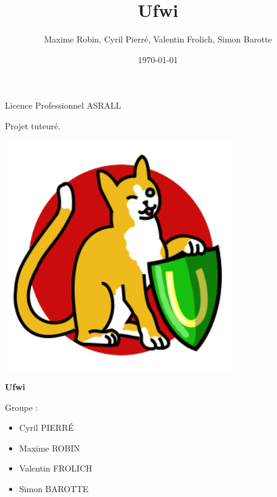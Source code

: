 \documentclass[12pt]{report}
\title{Ufwi}
\author{Maxime Robin, Cyril Pierré, Valentin Frolich, Simon Barotte}
\date{\today}
\begin{document}
\thispagestyle{empty}
\begin{center}
Licence Professionnel ASRALL


\vspace{1cm}
Projet tuteuré.

\vspace{2,5cm}

\begin{center}
  \includegraphics[width=10cm,height=10cm]{images/ufwi.png}
\end{center}

\vspace{1cm}
\textbf{\Huge Ufwi}


\end{center}

\vspace{4cm}

Groupe :
\begin{itemize}
  \item Cyril PIERRÉ
  \item Maxime ROBIN
  \item Valentin FROLICH
  \item Simon BAROTTE
\end{itemize}



\newpage

\renewcommand{\contentsname}{Sommaire}
\tableofcontents
\end{document}
